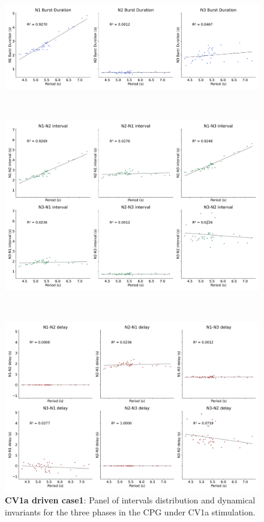 \begin{figure}[htbp]
\begin{minipage}[b]{0.53\textwidth}
		\centering
		\begin{minipage}[b]{\textwidth}
			\centering
			\includegraphics[width=\textwidth]{./invariants/data/SUSSEX/CV1a_driven1/images/stim_cv1a1_3phases_durations.pdf}
		\end{minipage}\\
		\begin{minipage}[b]{\textwidth}
			\centering
			\includegraphics[width=\textwidth]{./invariants/data/SUSSEX/CV1a_driven1/images/stim_cv1a1_3phases_intervals.pdf}
		\end{minipage}\\
		\begin{minipage}[b]{\textwidth}
			\centering
			\includegraphics[width=\textwidth]{./invariants/data/SUSSEX/CV1a_driven1/images/stim_cv1a1_3phases_delays.pdf}
		\end{minipage}
	\end{minipage}
	\caption{\textbf{CV1a driven case1}: Panel of intervals distribution and dynamical invariants for the three phases in the CPG under CV1a stimulation.}
	\label{fig:cv1a 1 3phases}
\end{figure}

